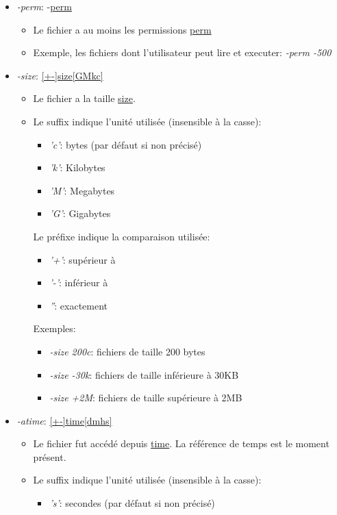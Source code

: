 \documentclass[11pt, a4paper]{article}
\begin{document}
\begin{itemize}
\begin{itemize}
	\end{itemize}
	\item \textit{-perm}: -\underline{perm}
	\begin{itemize}
		\item 		Le fichier a au moins les permissions \underline{perm}
		\item 		Exemple, les fichiers dont l'utilisateur peut lire et executer: \textit{-perm -500}
	\end{itemize}
	\item \textit{-size}: \underline{[+-]size[GMkc]}
	\begin{itemize}
		\item 		Le fichier a la taille \underline{size}.
		\item 		Le suffix indique l'unité utilisée (insensible à la casse):
		\begin{itemize}
			\item \textit{'c'}: bytes (par défaut si non précisé)
			\item \textit{'k'}: Kilobytes
			\item \textit{'M'}: Megabytes
			\item \textit{'G'}: Gigabytes
		\end{itemize}
		Le préfixe indique la comparaison utilisée:
		\begin{itemize}
			\item \textit{'+'}: supérieur à
			\item \textit{'-'}: inférieur à
			\item \textit{''}: exactement
		\end{itemize}
		Exemples:
		\begin{itemize}
			\item \textit{-size 200c}: fichiers de taille 200 bytes
			\item \textit{-size -30k}: fichiers de taille inférieure à 30KB
			\item \textit{-size +2M}: fichiers de taille supérieure à 2MB
		\end{itemize}
	\end{itemize}
	\item \textit{-atime}: \underline{[+-]time[dmhs]}
	\begin{itemize}
		\item	Le fichier fut accédé depuis \underline{time}. La référence de temps est le moment présent.
		\item	Le suffix indique l'unité utilisée (insensible à la casse):
		\begin{itemize}
            \item \textit{'s'}: secondes (par défaut si non précisé)

\end{itemize}
\end{itemize}
\end{itemize}
\end{document}
